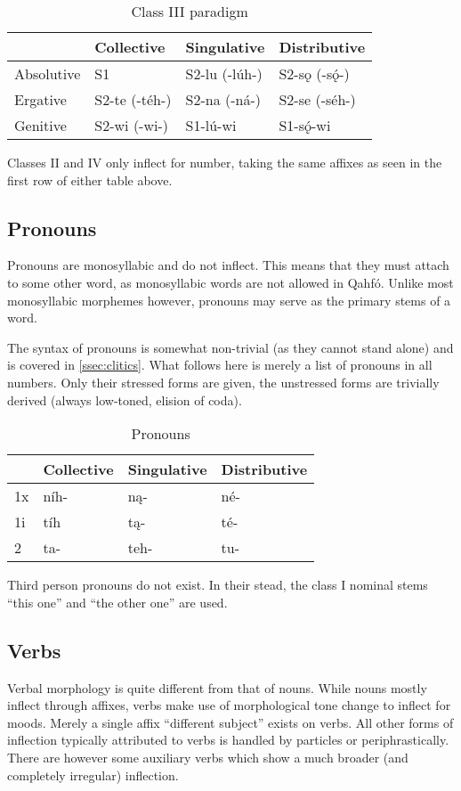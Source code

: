 \documentclass{article}
\newcommand{\en}[1]{``#1''}
\newcommand{\con}[1]{\hspace{0pt}{\color{olive}#1}}
\newcommand{\langname}{Qahfó}
\begin{document}
\begin{table}[H]
\centering
\caption{Class III paradigm}
\label{cl3}
\begin{tabular}{l|lll}
           & Collective & Singulative & Distributive    \\ \hline
Absolutive & S1         & S2-lu (-lúh-)       & S2-sǫ (-sǫ́-)    \\
Ergative   & S2-te (-téh-)      & S2-na  (-ná-)     & S2-se (-séh-)    \\
Genitive   & S2-wi (-wi-)     & S1-lú-wi    & S1-sǫ́-wi
\end{tabular}
\end{table}

Classes II and IV only inflect for number, taking the same affixes as seen in the first row of either table above.

\subsection{Pronouns}
Pronouns are monosyllabic and do not inflect. This means that they must attach to some other word, as monosyllabic words are not allowed in \langname{}. Unlike most monosyllabic morphemes however, pronouns may serve as the primary stems of a word.

The syntax of pronouns is somewhat non-trivial (as they cannot stand alone) and is covered in \ref{ssec:clitics}. What follows here is merely a list of pronouns in all numbers. Only their stressed forms are given, the unstressed forms are trivially derived (always low-toned, elision of coda).

\begin{table}[H]
\centering
\caption{Pronouns}
\label{pronouns}
\begin{tabular}{l|lll}
   & Collective & Singulative & Distributive \\ \hline
1x & níh-       & ną-         & né-    \\
1i & tíh        & tą-         & té-    \\
2  & ta-        & teh-        & tu-   
\end{tabular}
\end{table}

Third person pronouns do not exist. In their stead, the class I nominal stems \con{jíhsǫ́, jihsǫ} \en{this one} and \con{jóhkea, johkea} \en{the other one} are used.

\subsection{Verbs}
Verbal morphology is quite different from that of nouns. While nouns mostly inflect through affixes, verbs make use of morphological tone change to inflect for moods. Merely a single affix \con{-llą} \en{different subject} exists on verbs. All other forms of inflection typically attributed to verbs is handled by particles or periphrastically. There are however some auxiliary verbs which show a much broader (and completely irregular) inflection. 
\end{document}

